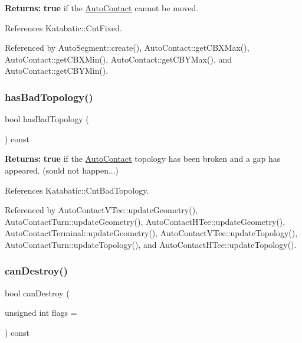 {\bfseries Returns\+:} {\bfseries true} if the \mbox{\hyperlink{classKatabatic_1_1AutoContact}{Auto\+Contact}} cannot be moved. 

References Katabatic\+::\+Cnt\+Fixed.



Referenced by Auto\+Segment\+::create(), Auto\+Contact\+::get\+C\+B\+X\+Max(), Auto\+Contact\+::get\+C\+B\+X\+Min(), Auto\+Contact\+::get\+C\+B\+Y\+Max(), and Auto\+Contact\+::get\+C\+B\+Y\+Min().

\mbox{\label{classKatabatic_1_1AutoContact_acc77b6de9050a86dc41e25888c8f81f6}} 
\subsubsection{\texorpdfstring{has\+Bad\+Topology()}{hasBadTopology()}}
{\footnotesize\ttfamily bool has\+Bad\+Topology (\begin{DoxyParamCaption}{ }\end{DoxyParamCaption}) const\hspace{0.3cm}{\ttfamily [inline]}}

{\bfseries Returns\+:} {\bfseries true} if the \mbox{\hyperlink{classKatabatic_1_1AutoContact}{Auto\+Contact}} topology has been broken and a gap has appeared. (sould not happen...) 

References Katabatic\+::\+Cnt\+Bad\+Topology.



Referenced by Auto\+Contact\+V\+Tee\+::update\+Geometry(), Auto\+Contact\+Turn\+::update\+Geometry(), Auto\+Contact\+H\+Tee\+::update\+Geometry(), Auto\+Contact\+Terminal\+::update\+Geometry(), Auto\+Contact\+V\+Tee\+::update\+Topology(), Auto\+Contact\+Turn\+::update\+Topology(), and Auto\+Contact\+H\+Tee\+::update\+Topology().

\mbox{\label{classKatabatic_1_1AutoContact_af783b79a1398450e28e2ea55c3eb8476}} 
\subsubsection{\texorpdfstring{can\+Destroy()}{canDestroy()}}
{\footnotesize\ttfamily bool can\+Destroy (\begin{DoxyParamCaption}\item[{unsigned int}]{flags = {} }\end{DoxyParamCaption}) const}

